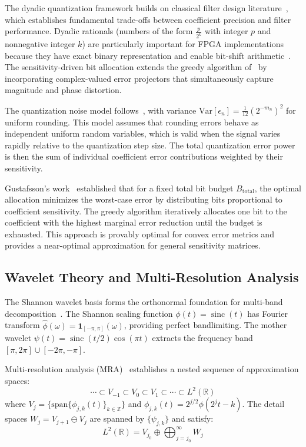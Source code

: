 The dyadic quantization framework builds on classical filter design literature~\cite{Gustafsson2007,OppenheimDSP}, which establishes fundamental trade-offs between coefficient precision and filter performance. Dyadic rationals (numbers of the form $\frac{p}{2^k}$ with integer $p$ and nonnegative integer $k$) are particularly important for FPGA implementations because they have exact binary representation and enable bit-shift arithmetic~\cite{Abdi2024}. The sensitivity-driven bit allocation extends the greedy algorithm of~\cite{Gustafsson2007} by incorporating complex-valued error projectors that simultaneously capture magnitude and phase distortion.

The quantization noise model follows~\cite{Widrow1996}, with variance $\mathrm{Var}[\epsilon_n] = \frac{1}{12}(2^{-m_n})^2$ for uniform rounding. This model assumes that rounding errors behave as independent uniform random variables, which is valid when the signal varies rapidly relative to the quantization step size. The total quantization error power is then the sum of individual coefficient error contributions weighted by their sensitivity.

Gustafsson's work~\cite{Gustafsson2007} established that for a fixed total bit budget $B_{\text{total}}$, the optimal allocation minimizes the worst-case error by distributing bits proportional to coefficient sensitivity. The greedy algorithm iteratively allocates one bit to the coefficient with the highest marginal error reduction until the budget is exhausted. This approach is provably optimal for convex error metrics and provides a near-optimal approximation for general sensitivity matrices.

\subsection{Wavelet Theory and Multi-Resolution Analysis}

The Shannon wavelet basis forms the orthonormal foundation for multi-band decomposition~\cite{Daubechies1992,Mallat1989}. The Shannon scaling function $\phi(t) = \operatorname{sinc}(t)$ has Fourier transform $\widehat{\phi}(\omega) = \mathbf{1}_{[-\pi,\pi]}(\omega)$, providing perfect bandlimiting. The mother wavelet $\psi(t) = \operatorname{sinc}(t/2)\cos(\pi t)$ extracts the frequency band $[\pi, 2\pi] \cup [-2\pi, -\pi]$.

Multi-resolution analysis (MRA)~\cite{Mallat1989,Daubechies1992} establishes a nested sequence of approximation spaces:
\[
\cdots \subset V_{-1} \subset V_0 \subset V_1 \subset \cdots \subset L^2(\mathbb{R})
\]
where $V_j = \{\text{span}\{\phi_{j,k}(t)\}_{k \in \mathbb{Z}}\}$ and $\phi_{j,k}(t) = 2^{j/2}\phi(2^j t - k)$. The detail spaces $W_j = V_{j+1} \ominus V_j$ are spanned by $\{\psi_{j,k}\}$ and satisfy:
\[
L^2(\mathbb{R}) = V_{j_0} \oplus \bigoplus_{j=j_0}^\infty W_j
\]

